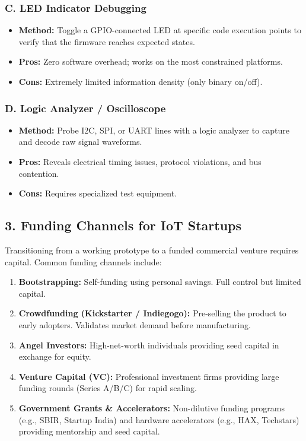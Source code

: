 \subsubsection{C. LED Indicator Debugging}
\begin{itemize}
  \item   \textbf{Method:} Toggle a GPIO-connected LED at specific code execution points to verify that the firmware reaches expected states.
  \item   \textbf{Pros:} Zero software overhead; works on the most constrained platforms.
  \item   \textbf{Cons:} Extremely limited information density (only binary on/off).
\end{itemize}

\subsubsection{D. Logic Analyzer / Oscilloscope}
\begin{itemize}
  \item   \textbf{Method:} Probe I2C, SPI, or UART lines with a logic analyzer to capture and decode raw signal waveforms.
  \item   \textbf{Pros:} Reveals electrical timing issues, protocol violations, and bus contention.
  \item   \textbf{Cons:} Requires specialized test equipment.
\end{itemize}


\subsection{3. Funding Channels for IoT Startups}
Transitioning from a working prototype to a funded commercial venture requires capital. Common funding channels include:
\begin{enumerate}
  \item \textbf{Bootstrapping:} Self-funding using personal savings. Full control but limited capital.
  \item \textbf{Crowdfunding (Kickstarter / Indiegogo):} Pre-selling the product to early adopters. Validates market demand before manufacturing.
  \item \textbf{Angel Investors:} High-net-worth individuals providing seed capital in exchange for equity.
  \item \textbf{Venture Capital (VC):} Professional investment firms providing large funding rounds (Series A/B/C) for rapid scaling.
  \item \textbf{Government Grants \& Accelerators:} Non-dilutive funding programs (e.g., SBIR, Startup India) and hardware accelerators (e.g., HAX, Techstars) providing mentorship and seed capital.
\end{enumerate}


